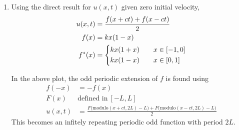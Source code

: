 \begin{enumerate}
    \item Using the direct result for $ u(x, t) $ given zero initial velocity,
          \begin{align}
              u(x, t) & = \frac{f(x + ct) + f(x - ct)}{2} \\
              f(x)    & = kx(1-x)                         \\
              f^*(x)  & = \begin{dcases}
                              kx(1+x) & \quad x \in [-1, 0] \\
                              kx(1-x) & \quad x \in [0, 1]
                          \end{dcases}
          \end{align}
          \begin{figure}[H]
              \centering
          \end{figure}
          In the above plot, the odd periodic extension of $ f $ is found using
          \begin{align}
              f(-x)   & = -f(x)                                          \\
              F(x) \  & \text{defined in}\ [-L, L]                       \\
              u(x, t) & = \frac{F\Big(\text{modulo}(x + ct, 2L) - L\Big)
                  + F\Big(\text{modulo}(x  - ct, 2L) - L\Big)}{2}
          \end{align}
          This becomes an infitely repeating periodic odd function with period $ 2L $.


\end{enumerate}
